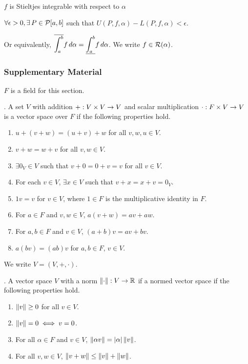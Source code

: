 \(f\) is Stieltjes integrable with respect to \(\alpha\) \miff
\begin{center}
    \(\forall \epsilon > 0, \exists P \in \mc{P}[a, b]\) such that \(U(P, f, \alpha) - L(P, f, \alpha) < \epsilon\).
\end{center}
Or equivalently, \(\displaystyle \overline{\int_{a}^{b}} f\,d{\alpha} = \underline{\int_{a}^{b}} f\,d{\alpha}\). We write \(f \in \mathcal{R}(\alpha)\).

\subsubsection{Supplementary Material}

\(F\) is a field for this section.

.  A set \(V\) with addition \(+: V\times V \rightarrow V\) and scalar multiplication \(\cdot : F \times V \rightarrow V\) is a vector space over \(F\) if the following properties hold.
\begin{enumerate}
    \item {} \(u + (v + w) = (u + v) + w\) for all \(v, w, u\in V\).
    \item {} \(v + w = w + v\) for all \(v, w \in V\).
    \item {} \(\exists 0_V \in V\) such that \(v + 0 = 0 + v = v\) for all \(v \in V\).
    \item {} For each \(v \in V\), \(\exists x \in V\) such that \(v + x = x + v = 0_V\).
    \item {} \(1v = v\) for \(v \in V\), where \(1 \in F\) is the multiplicative identity in \(F\).
    \item {} For \(a \in F\) and \(v, w \in V\), \(a(v + w) = av + aw\).
    \item {} For \(a, b \in F\) and \(v \in V\), \((a + b)v = av + bv\).
    \item {} \(a(bv) = (ab)v\) for \(a, b \in F\), \(v \in V\).
\end{enumerate}
We write \(V = (V, +, \cdot)\).

\medskip

.  A vector space \(V\) with a norm \(\left\lVert \cdot \right\rVert: V \rightarrow \mathbb{R}\) if a normed vector space if the following properties hold.
\begin{enumerate}
    \item \(\left\lVert v \right\rVert \geq 0\) for all \(v \in V\).
    \item \(\left\lVert v \right\rVert = 0 \iff v = 0\).
    \item For all \(\alpha \in F\) and \(v \in V\), \(\left\lVert \alpha v \right\rVert = \left| \alpha \right| \left\lVert v \right\rVert\).
    \item {} For all \(v, w \in V\), \(\left\lVert v + w \right\rVert \leq \left\lVert v \right\rVert + \left\lVert w \right\rVert\).
\end{enumerate}

